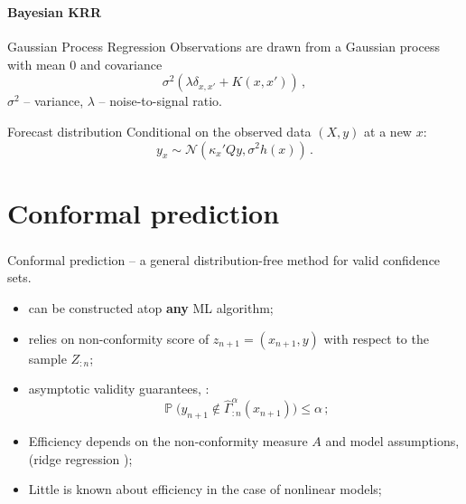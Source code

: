 \documentclass[t]{beamer}  %
\newcommand{\Ncal}{\mathcal{N}}
\newcommand{\pr}{\mathop{\mathbb{P}}\nolimits}
\begin{document}
\begin{frame}[c]\frametitle{\insertsection}
  \framesubtitle{Bayesian KRR}
  \begin{block}{Gaussian Process Regression}  
    Observations are drawn from a Gaussian process with mean $0$ and covariance
    $$ \sigma^2(\lambda\delta_{x,x'} + K(x,x')) \,,$$
    $\sigma^2$ -- variance, $\lambda$ -- noise-to-signal ratio.
  \end{block}
  \vspace{\baselineskip}
  \begin{block}{Forecast distribution}
  Conditional on the observed data $(X, y)$ at a new $x$:
  $$ y_x \sim \Ncal(\kappa_x' Q y, \sigma^2 h(x)) \,. $$
  \end{block}
\end{frame}


\section{Conformal prediction} %
\label{sec:conformal_prediction}

\begin{frame}[t]\frametitle{\insertsection}

  Conformal prediction -- a general distribution-free method for
  valid confidence sets.

  \begin{itemize}
    \item can be constructed atop \textbf{any} ML algorithm;
    \item relies on non-conformity score of $z_{n+1}=(x_{n+1}, y)$ with respect to
    the sample $Z_{:n}$;
    \item asymptotic validity guarantees, \cite{vovk2005}:
    $$ \pr\bigl( y_{n+1} \notin \hat{\Gamma}_{:n}^\alpha(x_{n+1}) \bigr) \leq \alpha \,; $$
    \item Efficiency depends on the non-conformity measure $A$ and model assumptions,
    (ridge regression \cite{burnaevV14});
    \item Little is known about efficiency in the case of nonlinear models;
  \end{itemize}
\end{frame}
\end{document}
